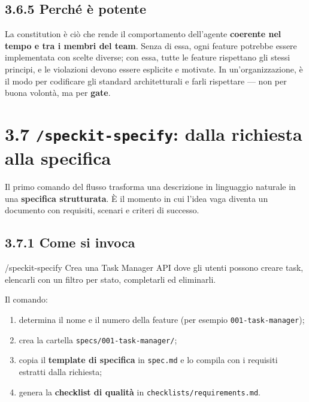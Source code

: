 \documentclass[
  italian,
  10pt,
]{book}
\newenvironment{Shaded}{\begin{snugshade}}{\end{snugshade}}
\newcommand{\NormalTok}[1]{#1}
\providecommand{\tightlist}{%
  \setlength{\itemsep}{0pt}\setlength{\parskip}{0pt}}
\begin{document}
\subsection{3.6.5 Perché è potente}\label{perchuxe9-uxe8-potente}

La constitution è ciò che rende il comportamento dell'agente
\textbf{coerente nel tempo e tra i membri del team}. Senza di essa, ogni
feature potrebbe essere implementata con scelte diverse; con essa, tutte
le feature rispettano gli stessi principi, e le violazioni devono essere
esplicite e motivate. In un'organizzazione, è il modo per codificare gli
standard architetturali e farli rispettare --- non per buona volontà, ma
per \textbf{gate}.

\section{\texorpdfstring{3.7 \texttt{/speckit-specify}: dalla richiesta
alla
specifica}{3.7 /speckit-specify: dalla richiesta alla specifica}}\label{speckit-specify-dalla-richiesta-alla-specifica}

Il primo comando del flusso trasforma una descrizione in linguaggio
naturale in una \textbf{specifica strutturata}. È il momento in cui
l'idea vaga diventa un documento con requisiti, scenari e criteri di
successo.

\subsection{3.7.1 Come si invoca}\label{come-si-invoca}

\begin{Shaded}
\begin{Highlighting}[]
\NormalTok{/speckit{-}specify Crea una Task Manager API dove gli utenti possono creare task,}
\NormalTok{elencarli con un filtro per stato, completarli ed eliminarli.}
\end{Highlighting}
\end{Shaded}

Il comando:

\begin{enumerate}
\def\labelenumi{\arabic{enumi}.}
\tightlist
\item
  determina il nome e il numero della feature (per esempio
  \texttt{001-task-manager});
\item
  crea la cartella \texttt{specs/001-task-manager/};
\item
  copia il \textbf{template di specifica} in \texttt{spec.md} e lo
  compila con i requisiti estratti dalla richiesta;
\item
  genera la \textbf{checklist di qualità} in
  \texttt{checklists/requirements.md}.
\end{enumerate}
\end{document}
